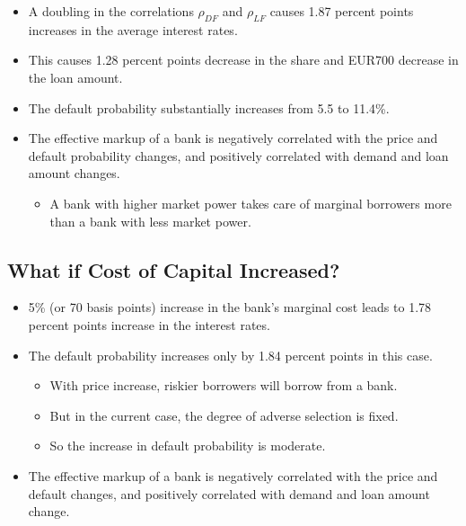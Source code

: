 \documentclass[]{book}
\providecommand{\tightlist}{%
  \setlength{\itemsep}{0pt}\setlength{\parskip}{0pt}}
\begin{document}
\begin{itemize}
\tightlist
\item
  A doubling in the correlations \(\rho_{DF}\) and \(\rho_{LF}\) causes
  1.87 percent points increases in the average interest rates.
\item
  This causes 1.28 percent points decrease in the share and EUR700
  decrease in the loan amount.
\item
  The default probability substantially increases from 5.5 to 11.4\%.
\item
  The effective markup of a bank is negatively correlated with the price
  and default probability changes, and positively correlated with demand
  and loan amount changes.

  \begin{itemize}
  \tightlist
  \item
    A bank with higher market power takes care of marginal borrowers
    more than a bank with less market power.
  \end{itemize}
\end{itemize}

\subsection{What if Cost of Capital
Increased?}\label{what-if-cost-of-capital-increased}

\begin{itemize}
\tightlist
\item
  5\% (or 70 basis points) increase in the bank's marginal cost leads to
  1.78 percent points increase in the interest rates.
\item
  The default probability increases only by 1.84 percent points in this
  case.

  \begin{itemize}
  \tightlist
  \item
    With price increase, riskier borrowers will borrow from a bank.
  \item
    But in the current case, the degree of adverse selection is fixed.
  \item
    So the increase in default probability is moderate.
  \end{itemize}
\item
  The effective markup of a bank is negatively correlated with the price
  and default changes, and positively correlated with demand and loan
  amount change.
\end{itemize}
\end{document}
